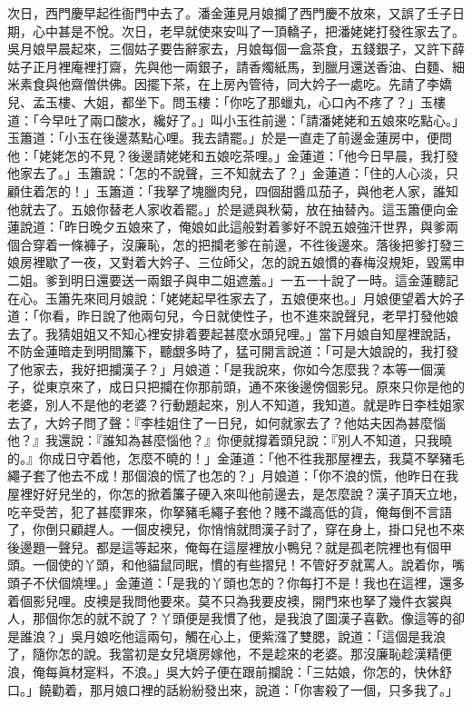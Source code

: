 次日，西門慶早起徃衙門中去了。潘金蓮見月娘攔了西門慶不放來，又誤了壬子日期，{}心中甚是不悅。{}次日，老早就使來安叫了一頂轎子，把潘姥姥打發徃家去了。{}吳月娘早晨起來，三個姑子要告辭家去，月娘每個一盒茶食，五錢銀子，又許下薛姑子正月裡庵裡打齋，先與他一兩銀子，請香燭紙馬，到臘月還送香油、白麵、細米素食與他齋僧供佛。因擺下茶，在上房內管待，同大妗子一處吃。先請了李嬌兒、孟玉樓、大姐，都坐下。問玉樓：「你吃了那蠟丸，心口內不疼了？」玉樓道：「今早吐了兩口酸水，纔好了。」叫小玉徃前邊：「請潘姥姥和五娘來吃點心。」玉簫道：「小玉在後邊蒸點心哩。我去請罷。」{}於是一直走了前邊金蓮房中，便問他：「姥姥怎的不見？後邊請姥姥和五娘吃茶哩。」金蓮道：「他今日早晨，我打發他家去了。」玉簫說：「怎的不說聲，三不知就去了？」金蓮道：「住的人心淡，只顧住着怎的！」玉簫道：「我拏了塊臘肉兒，四個甜醬瓜茄子，與他老人家，誰知他就去了。五娘你替老人家收着罷。」於是遞與秋菊，放在抽替內。這玉簫便向金蓮說道：「昨日晚夕五娘來了，俺娘如此這般對着爹好不說五娘強汗世界，與爹兩個合穿着一條褲子，沒廉恥，怎的把攔老爹在前邊，不徃後邊來。落後把爹打發三娘房裡歇了一夜，又對着大妗子、三位師父，怎的說五娘慣的春梅沒規矩，毀罵申二姐。爹到明日還要送一兩銀子與申二姐遮羞。」一五一十說了一時。這金蓮聽記在心。玉簫先來囘月娘說：「姥姥起早徃家去了，五娘便來也。」月娘便望着大妗子道：「你看，昨日說了他兩句兒，今日就使性子，也不進來說聲兒，老早打發他娘去了。我猜姐姐又不知心裡安排着要起甚麼水頭兒哩。」{}當下月娘自知屋裡說話，不防金蓮暗走到明間簾下，聽覷多時了，猛可開言說道：「可是大娘說的，我打發了他家去，我好把攔漢子？」月娘道：「是我說來，你如今怎麼我？本等一個漢子，從東京來了，成日只把攔在你那前頭，通不來後邊傍個影兒。原來只你是他的老婆，別人不是他的老婆？行動題起來，別人不知道，我知道。就是昨日李桂姐家去了，大妗子問了聲：『李桂姐住了一日兒，如何就家去了？他姑夫因為甚麼惱他？』我還說：『誰知為甚麼惱他？』你便就撐着頭兒說：『別人不知道，只我曉的。』{}你成日守着他，怎麼不曉的！」金蓮道：「他不徃我那屋裡去，我莫不拏豬毛繩子套了他去不成！那個浪的慌了也怎的？」{}月娘道：「你不浪的慌，他昨日在我屋裡好好兒坐的，你怎的掀着簾子硬入來叫他前邊去，是怎麼說？漢子頂天立地，吃辛受苦，犯了甚麼罪來，你拏豬毛繩子套他？{}賤不識高低的貨，俺每倒不言語了，你倒只顧趕人。一個皮襖兒，你悄悄就問漢子討了，穿在身上，掛口兒也不來後邊題一聲兒。{}都是這等起來，俺每在這屋裡放小鴨兒？就是孤老院裡也有個甲頭。一個使的丫頭，和他貓鼠同眠，慣的有些摺兒！不管好歹就罵人。說着你，嘴頭子不伏個燒埋。」金蓮道：「是我的丫頭也怎的？你每打不是！我也在這裡，還多着個影兒哩。皮襖是我問他要來。莫不只為我要皮襖，開門來也拏了幾件衣裳與人，那個你怎的就不說了？{}丫頭便是我慣了他，是我浪了圖漢子喜歡。像這等的卻是誰浪？」吳月娘吃他這兩句，觸在心上，便紫漒了雙腮，說道：「這個是我浪了，隨你怎的說。我當初是女兒塡房嫁他，不是趁來的老婆。那沒廉恥趁漢精便浪，俺每眞材寔料，不浪。」{}吳大妗子便在跟前攔說：「三姑娘，你怎的，快休舒口。」饒勸着，那月娘口裡的話紛紛發出來，說道：「你害殺了一個，只多我了。」